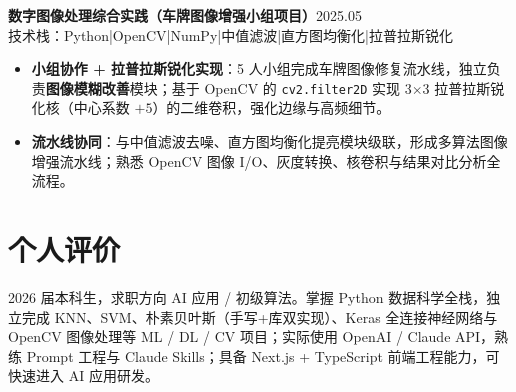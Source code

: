 \documentclass[10pt,a4paper]{article}
\newcommand{\projectblock}[3]{%
    {\bfseries\color{darktext}#1}\hfill{\color{graytext}#2}\\%
    {\small\color{graytext}#3}%
    \vspace{0.2em}%
}
\begin{document}
\vspace{0.15em}

\projectblock{数字图像处理综合实践（车牌图像增强小组项目）}{2025.05}{技术栈：Python\hspace{0.3em}|\hspace{0.3em}OpenCV\hspace{0.3em}|\hspace{0.3em}NumPy\hspace{0.3em}|\hspace{0.3em}中值滤波\hspace{0.3em}|\hspace{0.3em}直方图均衡化\hspace{0.3em}|\hspace{0.3em}拉普拉斯锐化}

\begin{itemize}[leftmargin=1.5em, itemsep=2pt, parsep=0pt, topsep=2pt]
    \item \textbf{小组协作 + 拉普拉斯锐化实现}：5 人小组完成车牌图像修复流水线，独立负责\textbf{图像模糊改善}模块；基于 OpenCV 的 \texttt{cv2.filter2D} 实现 3$\times$3 拉普拉斯锐化核（中心系数 $+5$）的二维卷积，强化边缘与高频细节。
    \item \textbf{流水线协同}：与中值滤波去噪、直方图均衡化提亮模块级联，形成多算法图像增强流水线；熟悉 OpenCV 图像 I/O、灰度转换、核卷积与结果对比分析全流程。
\end{itemize}

\vspace{0.15em}

\section{\faUser\hspace{0.4em}个人评价}

2026 届本科生，求职方向 AI 应用 / 初级算法。掌握 Python 数据科学全栈，独立完成 KNN、SVM、朴素贝叶斯（手写+库双实现）、Keras 全连接神经网络与 OpenCV 图像处理等 ML / DL / CV 项目；实际使用 OpenAI / Claude API，熟练 Prompt 工程与 Claude Skills；具备 Next.js + TypeScript 前端工程能力，可快速进入 AI 应用研发。

\vspace{0.15em}
\end{document}
